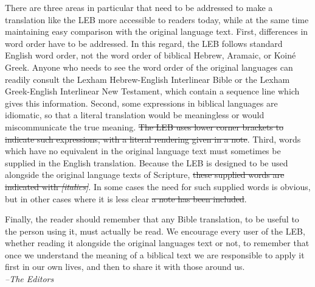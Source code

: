 There are three areas in particular that need to be addressed to make a translation like the LEB more accessible to readers 
today, while at the same time maintaining easy comparison with the original language text. First, differences in word order 
have to be addressed. In this regard, the LEB follows standard English word order, not the word order of biblical Hebrew, 
Aramaic, or Koiné Greek. Anyone who needs to see the word order of the original languages can readily consult the Lexham 
Hebrew-English Interlinear Bible or the Lexham Greek-English Interlinear New Testament, which contain a sequence line which 
gives this information. Second, some expressions in biblical languages are idiomatic, so that a literal translation would 
be meaningless or would miscommunicate the true meaning. \st{The LEB uses lower corner brackets to indicate such expressions, 
with a literal rendering given in a note}. Third, words which have no equivalent in the original language text must sometimes 
be supplied in the English translation. Because the LEB is designed to be used alongside the original language texts of 
Scripture, \st{these supplied words are indicated with \textit{[italics]}}. In some cases the need for such supplied words is obvious, 
but in other cases where it is less clear \st{a note has been included}.\par
Finally, the reader should remember that any Bible translation, to be useful to the person using it, must actually be read. 
We encourage every user of the LEB, whether reading it alongside the original languages text or not, to remember that once 
we understand the meaning of a biblical text we are responsible to apply it first in our own lives, and then to share it 
with those around us.\\
\textit{--The Editors}\par




